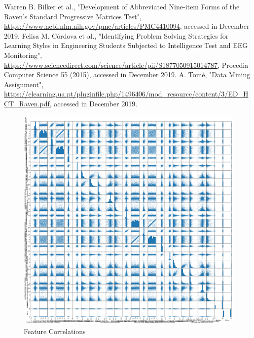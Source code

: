 \documentclass[conference]{IEEEtran}
\begin{document}
\begin{thebibliography}{00}
 Warren B. Bilker et al., "Development of Abbreviated Nine-item Forms of the Raven’s Standard Progressive Matrices Test", \url{https://www.ncbi.nlm.nih.gov/pmc/articles/PMC4410094}, accessed in December 2019.
 Felisa M. Córdova et al., "Identifying Problem Solving Strategies for Learning Styles in Engineering Students Subjected to Intelligence Test and EEG Monitoring", \url{https://www.sciencedirect.com/science/article/pii/S1877050915014787}, Procedia Computer Science 55 (2015), accessed in December 2019.
 A. Tomé, "Data Mining Assignment", \url{https://elearning.ua.pt/pluginfile.php/1496406/mod_resource/content/3/ED_HCT_Raven.pdf}, accessed in December 2019.

\end{thebibliography}
\vspace{12pt}

\clearpage
\appendix
\begin{figure}[h]
    \centering
    \includegraphics[width=2\linewidth]{featurecorrelation.png}
    \caption{Feature Correlations}
    \label{fig:feature}
\end{figure}
\end{document}
